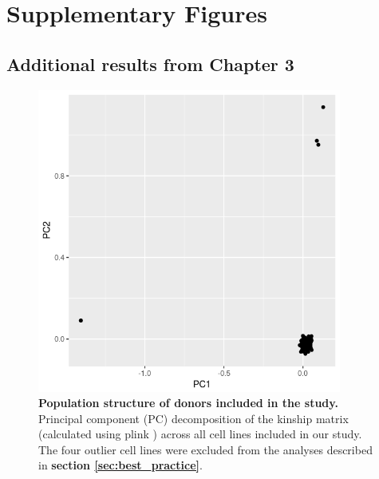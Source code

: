 
\chapter{Supplementary Figures}

\section{Additional results from Chapter 3}

\begin{figure}[h]
    \centering
    \includegraphics[width=10cm]{Appendix2/Fig/supplement_genotype_pcs.png}
    \caption[Population structure of donors included in the study]{\textbf{Population structure of donors included in the study.} \\
    Principal component (PC) decomposition of the kinship matrix (calculated using plink \cite{purcell2007plink}) across all cell lines included in our study.
    The four outlier cell lines were excluded from the analyses described in \textbf{section \ref{sec:best_practice}}.}
    \label{suppl_fig:kinship_pcs}
\end{figure}

